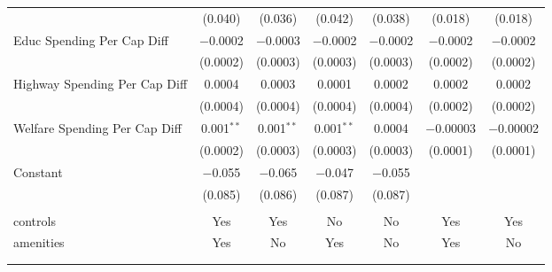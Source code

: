\begin{table}[!htbp]
\begin{tabular}{@{\extracolsep{5pt}}lcccccc}
  & (0.040) & (0.036) & (0.042) & (0.038) & (0.018) & (0.018) \\ 
  Educ Spending Per Cap Diff & $-$0.0002 & $-$0.0003 & $-$0.0002 & $-$0.0002 & $-$0.0002 & $-$0.0002 \\ 
  & (0.0002) & (0.0003) & (0.0003) & (0.0003) & (0.0002) & (0.0002) \\ 
  Highway Spending Per Cap Diff & 0.0004 & 0.0003 & 0.0001 & 0.0002 & 0.0002 & 0.0002 \\ 
  & (0.0004) & (0.0004) & (0.0004) & (0.0004) & (0.0002) & (0.0002) \\ 
  Welfare Spending Per Cap Diff & 0.001$^{**}$ & 0.001$^{**}$ & 0.001$^{**}$ & 0.0004 & $-$0.00003 & $-$0.00002 \\ 
  & (0.0002) & (0.0003) & (0.0003) & (0.0003) & (0.0001) & (0.0001) \\ 
  Constant & $-$0.055 & $-$0.065 & $-$0.047 & $-$0.055 &  &  \\ 
  & (0.085) & (0.086) & (0.087) & (0.087) &  &  \\ 
 \hline \\[-1.8ex] 
controls & Yes & Yes & No & No & Yes & Yes \\ 
amenities & Yes & No & Yes & No & Yes & No \\ 
\hline \\[-1.8ex] 
\hline 
\hline \\[-1.8ex] 
\end{tabular} 
\end{table} 
